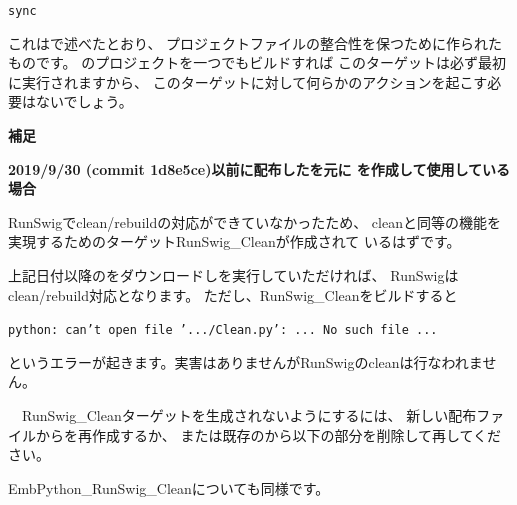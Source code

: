 \noindent
\tt{sync}
\begin{narrow}[20pt]
	\KLUDGE これは\KLUDGE で述べたとおり、
	\KLUDGE プロジェクトファイルの整合性を保つために作られたものです。
	\SprLib \KLUDGE のプロジェクトを一つでもビルドすれば
	\KLUDGE このターゲットは必ず最初に実行されますから、
	\KLUDGE このターゲットに対して何らかのアクションを起こす必要はないでしょう。
\end{narrow}

\bigskip
\bigskip
\noindent
\thinrule{\linewidth}
\noindent
\bf{\KLUDGE 補足}\KLUDGE 　
\begin{narrow}
	\bf{2019/9/30 (commit 1d8e5ce)\KLUDGE 以前に配布した\KLUDGE を元に
	\CMakeLists{}\KLUDGE を作成して使用している場合}

	\medskip
	RunSwig\KLUDGE でclean/rebuild\KLUDGE の対応ができていなかったため、
	clean\KLUDGE と同等の機能を実現するためのターゲットRunSwig\_Clean\KLUDGE が作成されて
	\KLUDGE いるはずです。

	\KLUDGE 上記日付以降の\SprLib \KLUDGE をダウンロードし\cmake \KLUDGE を実行していただければ、
	RunSwig\KLUDGE はclean/rebuild\KLUDGE 対応となります。
	\KLUDGE ただし、RunSwig\_Clean\KLUDGE をビルドすると
	\begin{narrow}
	\tt{python: can't open file '.../Clean.py': ... No such file ...}
	\end{narrow}
	\KLUDGE というエラーが起きます。実害はありませんがRunSwig\KLUDGE のclean\KLUDGE は行なわれません。

	\medskip
	\KLUDGE 　RunSwig\_Clean\KLUDGE ターゲットを生成されないようにするには、
	\KLUDGE 新しい配布ファイルから\CMakeLists{}\KLUDGE を再作成するか、
	\KLUDGE または既存の\CMakeLists{}\KLUDGE から以下の部分を削除して再\cmake \KLUDGE してください。

	\begin{narrow}\begin{figure}[h]
	    \begin{narrow}[30pt]
		\begin{center}\end{center}
		\label{fig:SpringheadLibraryTree}
	    \end{narrow}
	\end{figure}\end{narrow}
	
	EmbPython\_RunSwig\_Clean\KLUDGE についても同様です。	
	
\end{narrow}


